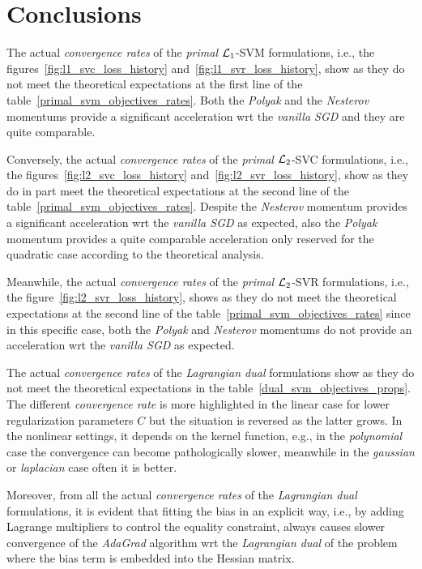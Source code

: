 \section{Conclusions}

The actual \emph{convergence rates} of the \emph{primal} $\protect \mathcal{L}_1$-SVM formulations, i.e., the figures~\ref{fig:l1_svc_loss_history} and~\ref{fig:l1_svr_loss_history}, show as they do not meet the theoretical expectations at the first line of the table~\ref{primal_svm_objectives_rates}. Both the \emph{Polyak} and the \emph{Nesterov} momentums provide a significant acceleration wrt the \emph{vanilla SGD} and they are quite comparable.

Conversely, the actual \emph{convergence rates} of the \emph{primal} $\protect \mathcal{L}_2$-SVC formulations, i.e., the figures~\ref{fig:l2_svc_loss_history} and~\ref{fig:l2_svr_loss_history}, show as they do in part meet the theoretical expectations at the second line of the table~\ref{primal_svm_objectives_rates}. Despite the \emph{Nesterov} momentum provides a significant acceleration wrt the \emph{vanilla SGD} as expected, also the \emph{Polyak} momentum provides a quite comparable acceleration only reserved for the quadratic case according to the theoretical analysis.

Meanwhile, the actual \emph{convergence rates} of the \emph{primal} $\protect \mathcal{L}_2$-SVR formulations, i.e., the figure~\ref{fig:l2_svr_loss_history}, shows as they do not meet the theoretical expectations at the second line of the table~\ref{primal_svm_objectives_rates} since in this specific case, both the \emph{Polyak} and \emph{Nesterov} momentums do not provide an acceleration wrt the \emph{vanilla SGD} as expected.

\bigskip

The actual \emph{convergence rates} of the \emph{Lagrangian dual} formulations show as they do not meet the theoretical expectations in the table~\ref{dual_svm_objectives_props}. The different \emph{convergence rate} is more highlighted in the linear case for lower regularization parameters $C$ but the situation is reversed as the latter grows. In the nonlinear settings, it depends on the kernel function, e.g., in the \emph{polynomial} case the convergence can become pathologically slower, meanwhile in the \emph{gaussian} or \emph{laplacian} case often it is better.

Moreover, from all the actual \emph{convergence rates} of the \emph{Lagrangian dual} formulations, it is evident that fitting the bias in an explicit way, i.e., by adding Lagrange multipliers to control the equality constraint, always causes slower convergence of the \emph{AdaGrad} algorithm wrt the \emph{Lagrangian dual} of the problem where the bias term is embedded into the Hessian matrix.

